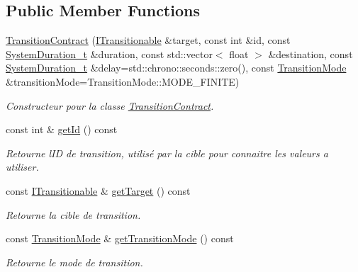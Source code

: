 \subsection*{Public Member Functions}
\begin{DoxyCompactItemize}
\item 
\hyperlink{classns_transition_1_1_transition_contract_a8ec4ef83c08901c9b93cec5eb0bfd06b}{Transition\+Contract} (\hyperlink{classns_transition_1_1_i_transitionable}{I\+Transitionable} \&target, const int \&id, const \hyperlink{namespacens_transition_a260258f249f46ff9a62da721537f87af}{System\+Duration\+\_\+t} \&duration, const std\+::vector$<$ float $>$ \&destination, const \hyperlink{namespacens_transition_a260258f249f46ff9a62da721537f87af}{System\+Duration\+\_\+t} \&delay=std\+::chrono\+::seconds\+::zero(), const \hyperlink{classns_transition_1_1_transition_contract_a40118ebf3c1a0a486934ce2b9ddc3edb}{Transition\+Mode} \&transition\+Mode=Transition\+Mode\+::\+M\+O\+D\+E\+\_\+\+F\+I\+N\+I\+TE)
\begin{DoxyCompactList}\small\item\em Constructeur pour la classe \hyperlink{classns_transition_1_1_transition_contract}{Transition\+Contract}. \end{DoxyCompactList}\item 
const int \& \hyperlink{classns_transition_1_1_transition_contract_a34a594d05171628bca81120c768c86b9}{get\+Id} () const
\begin{DoxyCompactList}\small\item\em Retourne l\textquotesingle{}ID de transition, utilisé par la cible pour connaitre les valeurs a utiliser. \end{DoxyCompactList}\item 
const \hyperlink{classns_transition_1_1_i_transitionable}{I\+Transitionable} \& \hyperlink{classns_transition_1_1_transition_contract_a464b06c739e50a374c4d11509cf6e5ee}{get\+Target} () const
\begin{DoxyCompactList}\small\item\em Retourne la cible de transition. \end{DoxyCompactList}\item 
const \hyperlink{classns_transition_1_1_transition_contract_a40118ebf3c1a0a486934ce2b9ddc3edb}{Transition\+Mode} \& \hyperlink{classns_transition_1_1_transition_contract_ad5d6524d7e2eeddf9f06204b8245c484}{get\+Transition\+Mode} () const
\begin{DoxyCompactList}\small\item\em Retourne le mode de transition. \end{DoxyCompactList}\item 

\end{DoxyCompactItemize}
